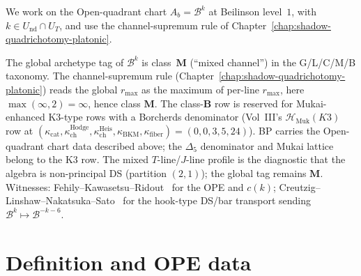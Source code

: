 \begin{remark}
\label{rem:bp-archetype-supremum}
We work on the Open-quadrant chart $A_b=\mathcal{B}^k$ at
Beilinson level~$1$, with
$k\in U_{\mathrm{nd}}\cap U_T$, and use the channel-supremum rule of
Chapter~\ref{chap:shadow-quadrichotomy-platonic}.

The global archetype tag of $\mathcal{B}^k$ is class~$\mathbf{M}$
(``mixed channel'') in the G/L/C/M/B taxonomy.
The channel-supremum rule
(Chapter~\ref{chap:shadow-quadrichotomy-platonic}) reads the global
$r_{\max}$ as the maximum of per-line $r_{\max}$, here
$\max(\infty,2)=\infty$, hence class $\mathbf{M}$. The
class-$\mathbf{B}$ row is reserved for Mukai-enhanced K3-type rows
with a Borcherds denominator (Vol~III's
$\mathcal H_{\mathrm{Muk}}(K3)$ row at
$(\kappa_{\mathrm{cat}},\kappa^{\mathrm{Hodge}}_{\mathrm{ch}},
\kappa^{\mathrm{Heis}}_{\mathrm{ch}},\kappa_{\mathrm{BKM}},
\kappa_{\mathrm{fiber}})=(0,0,3,5,24)$).  BP carries the Open-quadrant
chart data described above; the $\Delta_5$ denominator and Mukai
lattice belong to the K3 row. The mixed
$T$-line/$J$-line profile is the diagnostic that the algebra is
non-principal DS (partition $(2,1)$); the global tag remains $\mathbf{M}$.
Witnesses: Fehily--Kawasetsu--Ridout~\cite{FKR20} for the OPE and
$c(k)$; Creutzig--Linshaw--Nakatsuka--Sato~\cite{CLNS24} for the
hook-type DS/bar transport sending $\mathcal{B}^k\mapsto\mathcal{B}^{-k-6}$.
\end{remark}


\section{Definition and OPE data}


